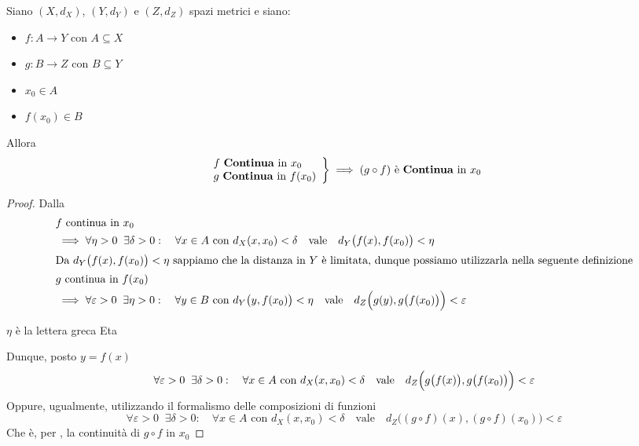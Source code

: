 \begin{proposition}
	Siano $(X,d_X)$, $(Y,d_Y)$ e $(Z,d_Z)$ spazi metrici e siano:
	\begin{itemize}[noitemsep]
		\item $f: A \to Y$ con $A \subseteq X$
		\item $g: B \to Z$ con $B \subseteq Y$
		\item $x_0 \in A$
		\item $f(x_0) \in B$
	\end{itemize}
	Allora
	\begin{equation*}
		\left.
		\begin{array}{l}
			f \text{ \textbf{Continua} in } x_0\\
			g \text{ \textbf{Continua} in } f(x_0)
		\end{array}
		\right\} \implies
		(g \circ f) \text{ è \textbf{Continua} in } x_0
	\end{equation*}
	\begin{proof}
		Dalla 
		\begin{align*}
			\lefteqn{f \text{ continua in } x_0}\\
			&\implies \forall \eta > 0\;\;\exists \delta > 0:\quad \forall x \in A \text{ con } d_X(x,x_0) < \delta \quad \text{vale} \quad d_Y \bigl(f(x),f(x_0)\bigr) < \eta\\
			\shortintertext{Da $d_Y \bigl(f(x),f(x_0)\bigr) < \eta$ sappiamo che la distanza in $Y$ è limitata, dunque possiamo utilizzarla nella seguente definizione}
			\lefteqn{g \text{ continua in } f(x_0)}\\
			&\implies \forall \varepsilon > 0\;\;\exists \eta > 0:\quad \forall y \in B \text{ con } d_Y\bigl(y,f(x_0)\bigr) < \eta \quad \text{vale} \quad d_Z \Bigl( g(y), g \bigl( f(x_0) \bigr) \Bigr) < \varepsilon
		\end{align*}
		\vspace*{-\baselineskip}
		\begin{note}
			$\eta$ è la lettera greca Eta
		\end{note}
		Dunque, posto $y = f(x)$
		\begin{equation*}
			\forall \varepsilon > 0\;\;\exists \delta > 0:\quad \forall x \in A \text{ con } d_X(x,x_0) < \delta \quad \text{vale} \quad d_Z \Bigl( g \bigl( f(x) \bigr), g \bigl( f(x_0) \bigr) \Bigr) < \varepsilon
		\end{equation*}
		Oppure, ugualmente, utilizzando il formalismo delle composizioni di funzioni
		\begin{equation*}
			\forall \varepsilon > 0\;\;\exists \delta > 0:\quad \forall x \in A \text{ con } d_X(x,x_0) < \delta \quad \text{vale} \quad d_Z \bigl( (g \circ f)(x), (g \circ f)(x_0) \bigr) < \varepsilon
		\end{equation*}
		Che è, per , la continuità di $g \circ f$ in $x_0$
	\end{proof}
\end{proposition}

